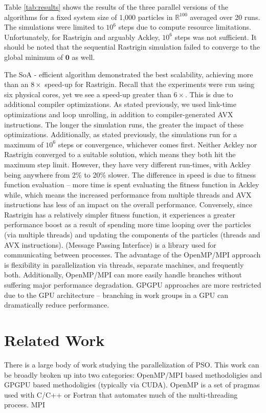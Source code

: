 Table \ref{tab:results} shows the results of the three parallel versions of the
algorithms for a fixed system size of 1,000 particles in $\mathbb{R}^{100}$
averaged over 20 runs. The simulations were limited to $10^6$ steps due to
compute resource limitations. 
Unfortunately, for Rastrigin and arguably Ackley, $10^6$ steps was not sufficient.
It should be noted that the sequential Rastrigin
simulation failed to converge to the global minimum of $\mathbf{0}$ as well.

The SoA - efficient algorithm demonstrated the best scalability, achieving more
than an $8\times$ speed-up for Rastrigin. Recall that the experiments were run
using six physical cores, yet we see a speed-up greater than $6\times$. This is
due to additional compiler optimizations. As stated previously, we used
link-time optimizations and loop unrolling, in addition to compiler-generated
AVX instructions. The longer the simulation runs, the greater the impact of
these optimizations. Additionally, as stated previously, the simulations run for
a maximum of $10^6$ steps or convergence, whichever comes first. Neither Ackley
nor Rastrigin converged to a suitable solution, which means they both hit the
maximum step limit. However, they have very different run-times, with Ackley
being anywhere from 2\% to 20\% slower. The difference in speed is due to
fitness function evaluation -- more time is spent evaluating the fitness
function in Ackley while, which means the increased performance from multiple
threads and AVX instructions has less of an impact on the overall
performance. Conversely, since Rastrigin has a relatively simpler fitness
function, it experiences a greater performance boost as a result of spending
more time looping over the particles (via multiple threads) and updating the
components of the particles (threads and AVX instructions).
(Message Passing Interface) is a library used for communicating between processes.
The advantage of the OpenMP/MPI
approach is flexibility in parallelization via threads, separate machines, and
frequently both. Additionally, OpenMP/MPI can more easily handle branches
without suffering major performance degradation.
GPGPU approaches are more restricted due to the GPU architecture
-- branching in work groups in a GPU can dramatically reduce performance.\par


\section{Related Work}\label{sec:prior}
There is a large body of work studying the parallelization of PSO. This work can
be broadly broken up into two categories: OpenMP/MPI based methodoligies and
GPGPU based methodoligies (typically via CUDA). OpenMP is a set of pragmas used
with C/C++ or Fortran that automates much of the multi-threading process. MPI


